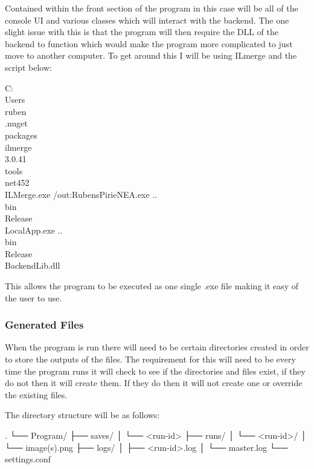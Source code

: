 \begin{FlushLeft}
    Contained within the front section of the program in this case will be all of the console UI and various classes which will interact with the backend. The one slight issue with this is that the program will then require the DLL of the backend to function which would make the program more complicated to just move to another computer. To get around this I will be using ILmerge and the script below:

    \begin{pseudocode}
C:\\Users\\ruben\\.nuget\\packages\\ilmerge\\3.0.41\\tools\\net452\\ILMerge.exe 
    /out:RubensPirieNEA.exe 
    ..\\bin\\Release\\LocalApp.exe 
    ..\\bin\\Release\\BackendLib.dll
    \end{pseudocode}

    This allows the program to be executed as one single .exe file making it easy of the user to use.\\ 

    \bk

    \subsubsection{Generated Files}
    When the program is run there will need to be certain directories created in order to store the outputs of the files. The requirement for this will need to be every time the program runs it will check to see if the directories and files exist, if they do not then it will create them. If they do then it will not create one or override the existing files. \\ \bk

    The directory structure will be as follows:
    \begin{pseudocode}
    .
    └── Program/
        ├── saves/
        │   └── <run-id>
        ├── runs/
        │   └── <run-id>/
        │       └── image(s).png
        ├── logs/
        │   ├── <run-id>.log
        │   └── master.log
        └── settings.conf
    \end{pseudocode}


\end{FlushLeft}
